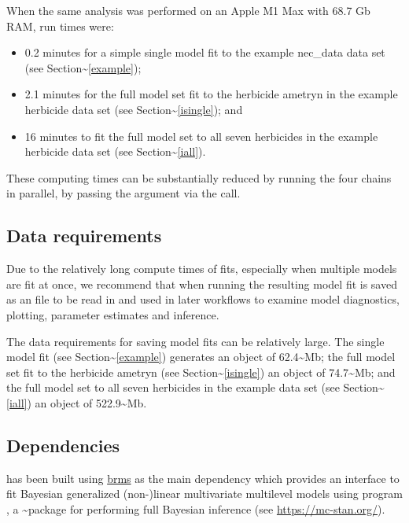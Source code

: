 \documentclass[
  shortnames]{jss}
\begin{document}
When the same analysis was performed on an Apple M1 Max with 68.7 Gb RAM, run times were:

\begin{itemize}
\item
  0.2 minutes for a simple single model fit to the example nec\_data data set (see Section\textasciitilde{}\ref{example});
\item
  2.1 minutes for the full  model set fit to the herbicide ametryn in the example herbicide data set (see Section\textasciitilde{}\ref{isingle}); and
\item
  16 minutes to fit the full  model set to all seven herbicides in the example herbicide data set (see Section\textasciitilde{}\ref{iall}).
\end{itemize}

These computing times can be substantially reduced by running the four chains in parallel, by passing the argument  via the  call.

\hypertarget{data-requirements}{%
\subsection{Data requirements}\label{data-requirements}}

Due to the relatively long compute times of  fits, especially when multiple models are fit at once, we recommend that when running  the resulting model fit is saved as an  file to be read in and used in later workflows to examine model diagnostics, plotting, parameter estimates and inference.

The data requirements for saving model fits can be relatively large. The single model fit (see Section\textasciitilde{}\ref{example}) generates an object of 62.4\textasciitilde Mb; the full  model set fit to the herbicide ametryn (see Section\textasciitilde{}\ref{isingle}) an object of 74.7\textasciitilde Mb; and the full  model set to all seven herbicides in the example data set (see Section\textasciitilde{}\ref{iall}) an object of 522.9\textasciitilde Mb.

\hypertarget{dependencies}{%
\subsection{Dependencies}\label{dependencies}}

 has been built using
\href{https://github.com/paul-buerkner/brms}{brms} \citep{Burkner2017} as the main dependency which provides an interface to fit Bayesian generalized
(non-)linear multivariate multilevel models using  program \citep{stan2021}, a \textasciitilde package
for performing full Bayesian inference (see \url{https://mc-stan.org/}).
\end{document}
